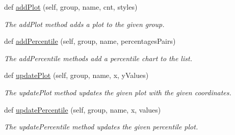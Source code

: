 \begin{DoxyCompactItemize}
def \hyperlink{classDQN-Deepmind-NIPS-2013_1_1Plotter_1_1Plotter_aafcbaaa8995b5e9f2859f25187895248}{add\+Plot} (self, group, name, cnt, styles)
\begin{DoxyCompactList}\small\item\em The add\+Plot method adds a plot to the given group. \end{DoxyCompactList}\item 
def \hyperlink{classDQN-Deepmind-NIPS-2013_1_1Plotter_1_1Plotter_ae8f20f0c734fc1447e4093638ac8b40f}{add\+Percentile} (self, group, name, percentages\+Pairs)
\begin{DoxyCompactList}\small\item\em The add\+Percentile methods add a percentile chart to the list. \end{DoxyCompactList}\item 
def \hyperlink{classDQN-Deepmind-NIPS-2013_1_1Plotter_1_1Plotter_acc6be1793e58dc9a665702177dae7cdb}{update\+Plot} (self, group, name, x, y\+Values)
\begin{DoxyCompactList}\small\item\em The update\+Plot method updates the given plot with the given coordinates. \end{DoxyCompactList}\item 
def \hyperlink{classDQN-Deepmind-NIPS-2013_1_1Plotter_1_1Plotter_a9efb9a96e31b427d493d434970279c51}{update\+Percentile} (self, group, name, x, values)
\begin{DoxyCompactList}\small\item\em The update\+Percentile method updates the given percentile plot. \end{DoxyCompactList}\end{DoxyCompactItemize}
